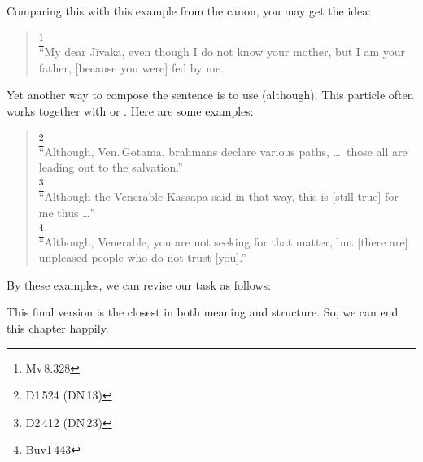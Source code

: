 
Comparing this with this example from the canon, you may get the idea:

\begin{quote} 
\footnote{Mv\,8.328}\\
``My dear J\=ivaka, even though I do not know your mother, but I am your father, [because you were] fed by me.\\
\end{quote}

Yet another way to compose the sentence is to use  (although). This particle often works together with  or . Here are some examples:

\begin{quote}
\footnote{D1\,524 (DN\,13)}\\
``Although, Ven.\,Gotama, brahmans declare various paths, \ldots\ those all are leading out to the salvation.''\\[1.5mm]
\footnote{D2\,412 (DN\,23)}\\
``Although the Venerable Kassapa said in that way, this is [still true] for me thus \ldots''\\[1.5mm]
\footnote{Buv1\,443}\\
``Although, Venerable, you are not seeking for that matter, but [there are] unpleased people who do not trust [you].''\\
\end{quote}

By these examples, we can revise our task as follows:


This final version is the closest in both meaning and structure. So, we can end this chapter happily.

